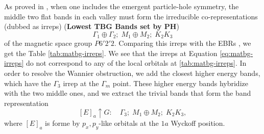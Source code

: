 As proved in \cite{all_magic_angles}, when one includes the emergent particle-hole symmetry, the middle two flat bands in each valley must form the irreducible co-representations (dubbed as irreps) (\textbf{Lowest TBG Bands set by PH})
\begin{equation} \label{eq:matbg-irreps}
\Gamma_1 \oplus \Gamma_2; \; M_1 \oplus M_2; \; K_2 K_3
\end{equation}
of the magnetic space group $P6'2'2$. Comparing this irreps with the EBRs \cite{topological_quantum_chemistry}, we get the Table \ref{tab:matbg-irreps}. We see that the irreps at Equation \ref{eq:matbg-irreps} do not correspond to any of the local orbitals at \ref{tab:matbg-irreps}. In order to resolve the Wannier obstruction, we add the closest higher energy bands, which have the $\Gamma_3$ irrep at the $\Gamma_m$ point. These higher energy bands hybridize with the two middle ones, and we extract the trivial bands that form the band representation
\begin{equation} \label{eq:trivial-irreps}
[E]_a \uparrow G: \quad \Gamma_3; \; M_1 \oplus M_2; \; K_2 K_3,
\end{equation}
where $[E]_a$ is forme by $p_x, p_y$-like orbitals at the $1a$ Wyckoff position.

